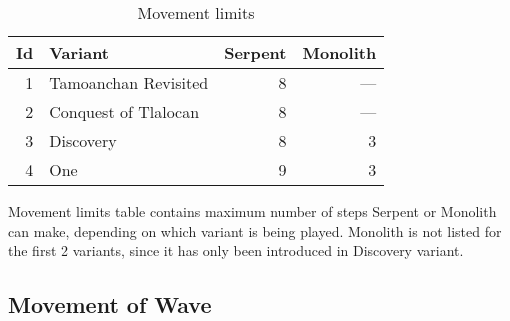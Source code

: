 \begin{table}[!h]
\centering
\begin{tabular}{ rlrr }
\toprule
\textbf{Id} & \textbf{Variant}      & \textbf{Serpent}  & \textbf{Monolith}         \\
\midrule
          1 & Tamoanchan Revisited  &                 8 &                       --- \\
          2 & Conquest of Tlalocan  &                 8 &                       --- \\
          3 & Discovery             &                 8 &                         3 \\
          4 & One                   &                 9 &                         3 \\
\bottomrule
\end{tabular}
\caption{Movement limits}
\label{tbl:Appendix/Summary/Movement limits}
\end{table}

Movement limits table contains maximum number of steps Serpent or Monolith can make,
depending on which variant is being played. Monolith is not listed for the first 2
variants, since it has only been introduced in Discovery variant.

\clearpage %

\subsection*{Movement of Wave}
\label{sec:Appendix/Movement of Wave}


